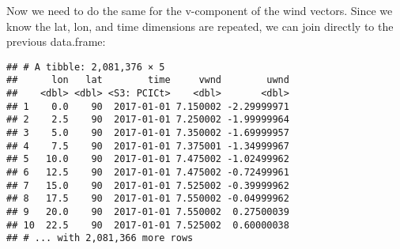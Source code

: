 \documentclass[]{book}
\newenvironment{Shaded}{\begin{snugshade}}{\end{snugshade}}
\newcommand{\KeywordTok}[1]{\textcolor[rgb]{0.13,0.29,0.53}{\textbf{{#1}}}}
\newcommand{\DataTypeTok}[1]{\textcolor[rgb]{0.13,0.29,0.53}{{#1}}}
\newcommand{\StringTok}[1]{\textcolor[rgb]{0.31,0.60,0.02}{{#1}}}
\newcommand{\OtherTok}[1]{\textcolor[rgb]{0.56,0.35,0.01}{{#1}}}
\newcommand{\NormalTok}[1]{{#1}}
\begin{document}
Now we need to do the same for the v-component of the wind vectors.
Since we know the lat, lon, and time dimensions are repeated, we can
join directly to the previous data.frame:

\begin{Shaded}
\end{Shaded}

\begin{verbatim}
## # A tibble: 2,081,376 × 5
##      lon   lat        time     vwnd        uwnd
##    <dbl> <dbl> <S3: PCICt>    <dbl>       <dbl>
## 1    0.0    90  2017-01-01 7.150002 -2.29999971
## 2    2.5    90  2017-01-01 7.250002 -1.99999964
## 3    5.0    90  2017-01-01 7.350002 -1.69999957
## 4    7.5    90  2017-01-01 7.375001 -1.34999967
## 5   10.0    90  2017-01-01 7.475002 -1.02499962
## 6   12.5    90  2017-01-01 7.475002 -0.72499961
## 7   15.0    90  2017-01-01 7.525002 -0.39999962
## 8   17.5    90  2017-01-01 7.550002 -0.04999962
## 9   20.0    90  2017-01-01 7.550002  0.27500039
## 10  22.5    90  2017-01-01 7.525002  0.60000038
## # ... with 2,081,366 more rows
\end{verbatim}
\end{document}
